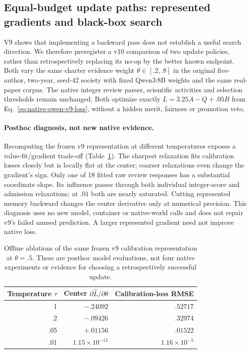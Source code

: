 \subsection{Equal-budget update paths: represented gradients and black-box search}
\label{sec:native-method-paths-v10}

V9 shows that implementing a backward pass does not establish a useful search
direction. We therefore preregister a v10 comparison of two update
policies, rather than retrospectively replacing its no-op by the better known
endpoint. Both vary the same charter evidence weight $\theta\in[.2,.8]$ in the
original five-author, two-year, seed-42 society with fixed Qwen3:8B weights and
the same real-paper corpus. The native integer review parser, scientific
activities and selection thresholds remain unchanged. Both optimize exactly
$L=3.25A-Q+.05R$ from Eq.~\eqref{eq:native-qwen-v9-loss}, without a hidden
merit, fairness or promotion veto.

\paragraph{Posthoc diagnosis, not new native evidence.}
Recomputing the frozen v9 representation at different temperatures exposes a
value-fit/gradient trade-off (Table~\ref{tab:native-v10-diagnosis}). The sharpest
relaxation fits calibration losses closely but is locally flat at the center;
coarser relaxations even change the gradient's sign. Only one of 18 fitted raw
review responses has a substantial coordinate slope. Its influence passes
through both individual integer-score and admission relaxations; at $.01$
both are nearly saturated. Cutting represented memory backward changes the
center derivative only at numerical precision. This diagnosis uses no new
model, container or native-world calls and does not repair v9's failed unused
prediction. A larger represented gradient need not improve native loss.

\begin{table}[t]
\caption{Offline ablations of the same frozen v9 calibration representation
at $\theta=.5$. These are posthoc model evaluations, not four native
experiments or evidence for choosing a retrospectively successful update.}
\label{tab:native-v10-diagnosis}
\centering
\small
\begin{tabular}{rrr}
\toprule
Temperature $\tau$ & Center $\partial\widehat L/\partial\theta$ & Calibration-loss RMSE \\
\midrule
1    & $-.24092$ & $.52717$ \\
.2   & $-.09426$ & $.32974$ \\
.05  & $+.01156$ & $.01522$ \\
.01  & $1.15\!\times\!10^{-15}$ & $1.16\!\times\!10^{-5}$ \\
\bottomrule
\end{tabular}
\end{table}


